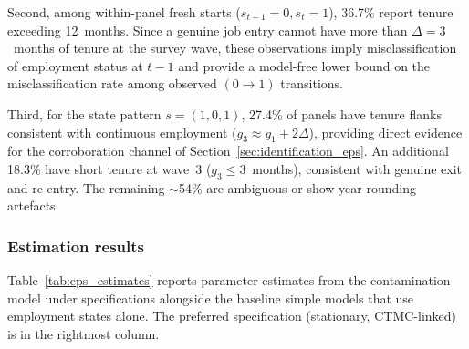 Second, among within-panel fresh starts ($s_{t-1}=0, s_t=1$), 36.7\%
report tenure exceeding 12~months. Since a genuine job entry cannot have
more than $\Delta = 3$~months of tenure at the survey wave, these
observations imply misclassification of employment status at $t{-}1$ and
provide a model-free lower bound on the misclassification rate among
observed $(0 \to 1)$ transitions.

Third, for the state pattern $s = (1,0,1)$, 27.4\% of panels have tenure
flanks consistent with continuous employment ($g_3 \approx g_1 + 2\Delta$),
providing direct evidence for the corroboration channel of
Section~\ref{sec:identification_eps}. An additional 18.3\% have short
tenure at wave~3 ($g_3 \le 3$~months), consistent with genuine exit and
re-entry. The remaining $\sim$54\% are ambiguous or show year-rounding
artefacts.

\subsubsection{Estimation results}

Table~\ref{tab:eps_estimates} reports parameter estimates from the
contamination model under specifications alongside the
baseline simple models that use employment states alone. The preferred
specification (stationary, CTMC-linked) is in the rightmost column.

